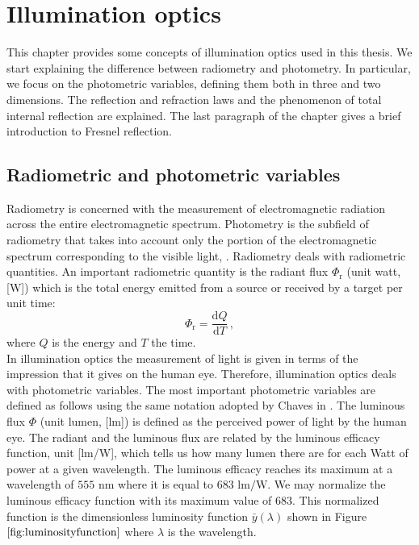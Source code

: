 \chapter{Illumination optics}
This chapter provides some concepts of illumination optics used in this thesis. We start explaining the difference between radiometry and photometry.
In particular, we focus on the photometric variables, defining them both in three and two dimensions. The reflection and refraction laws and the phenomenon of total internal reflection are explained. The last paragraph of the chapter gives a brief introduction to Fresnel reflection. 
\section{Radiometric and photometric variables}
Radiometry is concerned with the measurement of electromagnetic radiation across the entire electromagnetic spectrum. Photometry is the subfield of radiometry that takes into account only the portion of the electromagnetic spectrum corresponding to the visible light, \cite{zalewski1995radiometry}. Radiometry deals with radiometric quantities. An important radiometric quantity  is the radiant flux $\Phi_{\textrm{r}}$ (unit watt, [\textrm{W}]) which is the total energy emitted from a source or received by a target per unit time:
\begin{equation}
\Phi_{\textrm{r}} = \frac{\textrm{d}Q}{\textrm{d}T}\,,
\end{equation}
where $Q$ is the energy and $T$ the time.\\
\indent In illumination optics the measurement of light is given in terms of the impression that it gives on the human eye. Therefore, illumination optics deals with photometric variables. The most important photometric variables are defined as follows using the same notation adopted by Chaves in \cite{chaves2015introduction}. The luminous flux $\Phi$ (unit lumen, [\textrm{lm}]) is defined as the perceived power of light by the human eye.
 The radiant and the luminous flux are related by the luminous efficacy function, unit [\textrm{lm}/\textrm{W}], which tells us how many lumen there are for each Watt of power at a given wavelength.
 The luminous efficacy reaches its maximum  at a wavelength of $555$ $\textrm{nm}$ where it is equal to $683$ $\textrm{lm}/\textrm{W}$.
  We may normalize the luminous efficacy function with its maximum value of $683$.
  This normalized function is the dimensionless luminosity function $\bar{y}(\lambda)$ shown in Figure $\ref{fig:luminosityfunction}$ where $\lambda$ is the wavelength.
